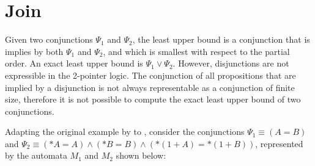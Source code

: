
\section{Join}

Given two conjunctions $\Psi_1$ and $\Psi_2$, the least upper bound is a conjunction that is implies by both $\Psi_1$ and $\Psi_2$,
and which is smallest with respect to the partial order.
An exact least upper bound is $\Psi_1 \lor \Psi_2$.
However, disjunctions are not expressible in the 2-pointer logic.
The conjunction of all propositions that are implied by a disjunction is not always representable as a conjunction of finite size\cite{join,2pointer},
therefore it is not possible to compute the exact least upper bound of two conjunctions.

\begin{example}\label{example:infinite-join}
    Adapting the original example by \textcite{join} to \cpo, consider the conjunctions $\Psi_1 \equiv (A = B)$ and $\Psi_2 \equiv (*A = A)\land (*B=B) \land (*(1 + A) = *(1 + B))$, represented by the automata $M_1$ and $M_2$ shown below:
    \begin{center}
    \begin{minipage}{0.3\textwidth}
        \centering
    \end{minipage}
    \begin{minipage}{0.65\textwidth}
        \centering
\end{minipage}
\end{center}
\end{example}
